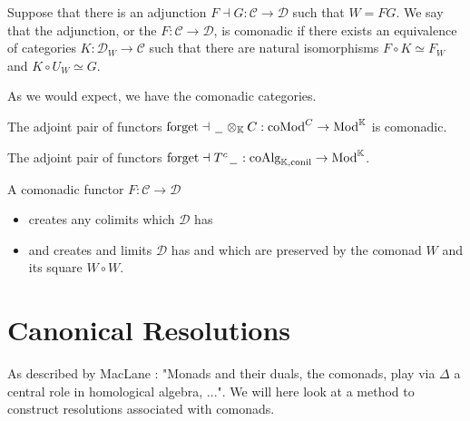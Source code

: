 \documentclass[../thesis.tex]{subfiles}
\begin{document}
    \begin{definition}[Comonadicity]
        Suppose that there is an adjunction $F \dashv G: \mathcal{C} \rightarrow \mathcal{D}$ such that $W = FG$. We say that the adjunction, or the $F: \mathcal{C} \rightarrow \mathcal{D}$, is comonadic if there exists an equivalence of categories $K: \mathcal{D}_W \rightarrow \mathcal{C}$ such that there are natural isomorphisms $F\circ K \simeq F_W$ and $K\circ U_W \simeq G$.
    \end{definition}

    As we would expect, we have the comonadic categories.
    \begin{example}
        The adjoint pair of functors $\text{forget} \dashv \hspace{0.05cm}\underline{\hspace{0.2cm}}\hspace{0.05cm}\otimes_\mathbb{K} C : \text{coMod}^C \rightarrow \text{Mod}^\mathbb{K}$ is comonadic.
    \end{example}

    \begin{example}
        The adjoint pair of functors $\text{forget} \dashv T^c\hspace{0.05cm}\underline{\hspace{0.2cm}}\hspace{0.05cm} : \text{coAlg}_{\mathbb{K},\text{conil}} \rightarrow \text{Mod}^\mathbb{K}$.
    \end{example}

    \begin{thm}\label{thm: limit-creation}
        A comonadic functor $F : \mathcal{C} \rightarrow \mathcal{D}$
        \begin{itemize}
            \item creates any colimits which $\mathcal{D}$ has
            \item and creates and limits $\mathcal{D}$ has and which are preserved by the comonad $W$ and its square $W\circ W$.
        \end{itemize}
    \end{thm}

    \section{Canonical Resolutions}
        As described by MacLane \cite[180]{MacLane71}: "Monads and their duals, the comonads, play via $\Delta$ a central role in homological algebra, ...". We will here look at a method to construct resolutions associated with comonads.
\end{document}
